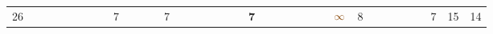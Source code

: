\begin{landscape}
\begin{table}
\begin{adjustwidth}{-2.6cm}{}
{\begin{tabular}{l|lllllllllllllllllllllllllllllllll|ll}
		26   &            &                                                                 &                                                                 &                                                                 &                                                                 &                                                                 &                                                                 & 7                                                               &                                                                 &                                                                 &                                                                 & 7                                                               &                                                                 &                                                                 &                                                                 &                                                                 &                                                                 &                                                                 & \textbf{7}                                                      &                                                                 &                                                                 &                                                                 &                                                                 &                                                                 &                                                                 & $\textcolor[rgb]{0.541,0.29,0.043}{\infty}$ & 8                                                               &                                                                 &                                                                 &                                                                 &                                                                 &                                                                 & 7                                                               & 15         & 14          \\

\end{tabular}}
\end{adjustwidth}
\end{table}
\end{landscape}
